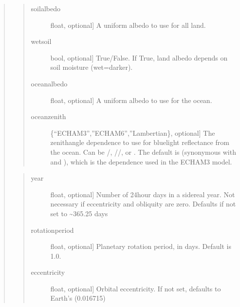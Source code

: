 \documentclass[letterpaper,10pt,english]{sphinxmanual}
\begin{document}
\begin{fulllineitems}
\begin{fulllineitems}
\begin{quote}
\begin{quote}
\begin{description}
\item[{soilalbedo}] \leavevmode{[}float, optional{]}
A uniform albedo to use for all land.

\item[{wetsoil}] \leavevmode{[}bool, optional{]}
True/False. If True, land albedo depends on soil moisture (wet=darker).

\item[{oceanalbedo}] \leavevmode{[}float, optional{]}
A uniform albedo to use for the ocean.

\item[{oceanzenith}] \leavevmode{[}\{“ECHAM\sphinxhyphen{}3”,”ECHAM\sphinxhyphen{}6”,”Lambertian\}, optional{]}
The zenith\sphinxhyphen{}angle dependence to use for blue\sphinxhyphen{}light reflectance from the ocean.
Can be /, //, or .
The default is  (synonymous with  and ), which is
the dependence used in the ECHAM\sphinxhyphen{}3 model.

\end{description}
\end{quote}

\begin{quote}
\begin{description}
\item[{year}] \leavevmode{[}float, optional{]}
Number of 24\sphinxhyphen{}hour days in a sidereal year. Not necessary if eccentricity and
obliquity are zero. Defaults if not set to \textasciitilde{}365.25 days

\item[{rotationperiod}] \leavevmode{[}float, optional{]}
Planetary rotation period, in days. Default is 1.0.

\item[{eccentricity}] \leavevmode{[}float, optional{]}
Orbital eccentricity. If not set, defaults to Earth’s (0.016715)


\end{description}
\end{quote}
\end{quote}
\end{fulllineitems}
\end{fulllineitems}
\end{document}

